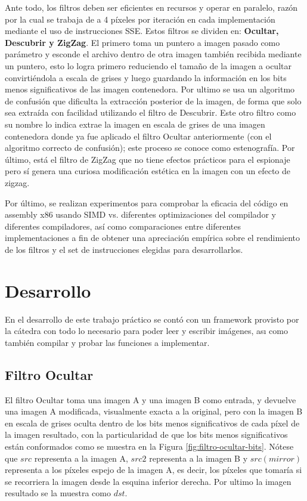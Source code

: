 \documentclass[a4paper]{article}
\begin{document}
Ante todo, los filtros deben ser eficientes en recursos y operar en paralelo, razón por la cual se trabaja de a 4 píxeles por iteración en cada implementación mediante el uso de instrucciones SSE. Estos filtros se dividen en: \textbf{Ocultar, Descubrir y ZigZag}. El primero toma un puntero a imagen pasado como parámetro y esconde el archivo dentro de otra imagen también recibida mediante un puntero, esto lo logra primero reduciendo el tamaño de la imagen a ocultar convirtiéndola a escala de grises y luego guardando la información en los bits menos significativos de las imagen contenedora. Por ultimo se usa un algoritmo de confusión que dificulta la extracción posterior de la imagen, de forma que solo sea extraída con facilidad utilizando el filtro de Descubrir. Este otro filtro como su nombre lo indica extrae la imagen en escala de grises de una imagen contenedora donde ya fue aplicado el filtro Ocultar anteriormente (con el algoritmo correcto de confusión); este proceso se conoce como estenografía.  Por último, está el filtro de ZigZag que no tiene efectos prácticos para el espionaje pero sí genera una curiosa modificación estética en la imagen con un efecto de zigzag.

Por último, se realizan experimentos para comprobar la eficacia del código en assembly x86 usando SIMD vs. diferentes optimizaciones del compilador y diferentes compiladores, así como comparaciones entre diferentes implementaciones a fin de obtener una apreciación empírica sobre el rendimiento de los filtros y el set de instrucciones elegidas para desarrollarlos. 

\section{Desarrollo}

En el desarrollo de este trabajo práctico se contó con un framework provisto por la cátedra con todo lo necesario para poder leer y escribir imágenes, ası como también compilar y probar las funciones a implementar.

\subsection{Filtro Ocultar} \label{sec:filtro-ocultar}

El filtro Ocultar toma una imagen A y una imagen B como entrada, y devuelve una imagen A modificada, visualmente exacta a la original, pero con la imagen B en escala de grises oculta dentro de los bits menos significativos de cada píxel de la imagen resultado, con la particularidad de que los bits menos significativos están conformados como se muestra en la Figura \ref{fig:filtro-ocultar-bits}. Nótese que $src$ representa a la imagen A, $src2$ representa a la imagen B y $src(mirror)$ representa a los píxeles espejo de la imagen A, es decir, los píxeles que tomaría si se recorriera la imagen desde la esquina inferior derecha. Por ultimo la imagen resultado se la muestra como $dst$.
\end{document}
